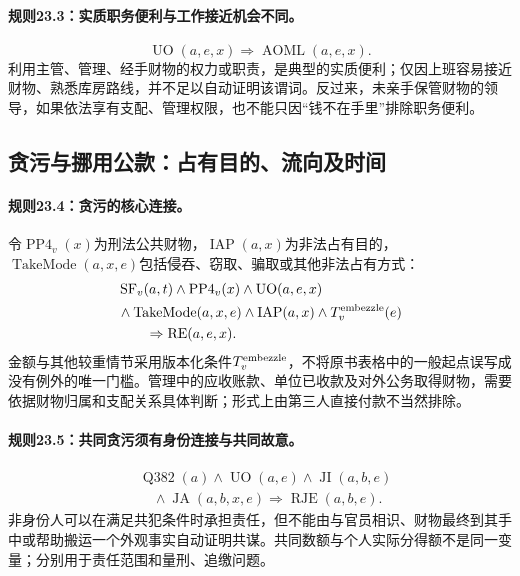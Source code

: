 \paragraph{规则23.3：实质职务便利与工作接近机会不同。}
\[
\operatorname{UO}(a,e,x)
\Rightarrow\operatorname{AOML}(a,e,x).
\]
利用主管、管理、经手财物的权力或职责，是典型的实质便利；仅因上班容易接近财物、熟悉库房路线，并不足以自动证明该谓词。反过来，未亲手保管财物的领导，如果依法享有支配、管理权限，也不能只因“钱不在手里”排除职务便利。

\subsection{贪污与挪用公款：占有目的、流向及时间}
\paragraph{规则23.4：贪污的核心连接。}
令$\operatorname{PP4}_v(x)$为刑法公共财物，$\operatorname{IAP}(a,x)$为非法占有目的，$\operatorname{TakeMode}(a,x,e)$包括侵吞、窃取、骗取或其他非法占有方式：
\[
\begin{aligned}
&\operatorname{SF}_v(a,t)\land\operatorname{PP4}_v(x)
\land\operatorname{UO}(a,e,x)\\
&\land\operatorname{TakeMode}(a,x,e)\land\operatorname{IAP}(a,x)
\land T^{\rm embezzle}_v(e)\\
&\qquad\Rightarrow\operatorname{RE}(a,e,x).
\end{aligned}
\]
金额与其他较重情节采用版本化条件$T^{\rm embezzle}_v$，不将原书表格中的一般起点误写成没有例外的唯一门槛。管理中的应收账款、单位已收款及对外公务取得财物，需要依据财物归属和支配关系具体判断；形式上由第三人直接付款不当然排除。

\paragraph{规则23.5：共同贪污须有身份连接与共同故意。}
\[
\begin{aligned}
&\operatorname{Q382}(a)\land\operatorname{UO}(a,e)
\land\operatorname{JI}(a,b,e)\\
&\quad\land\operatorname{JA}(a,b,x,e)
\Rightarrow\operatorname{RJE}(a,b,e).
\end{aligned}
\]
非身份人可以在满足共犯条件时承担责任，但不能由与官员相识、财物最终到其手中或帮助搬运一个外观事实自动证明共谋。共同数额与个人实际分得额不是同一变量；分别用于责任范围和量刑、追缴问题。

